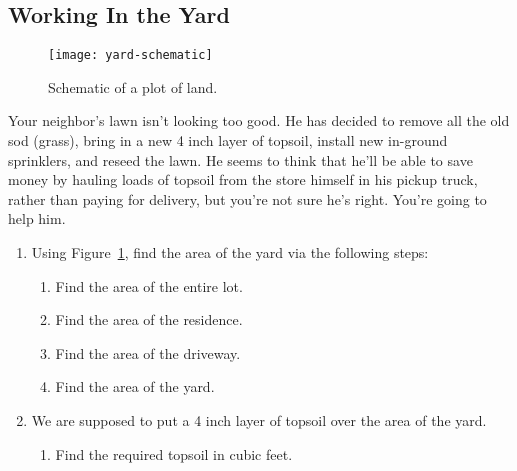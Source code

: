\newpage

\subsection{Working In the Yard}%
\label{sub:working-in-yard}

\begin{figure}[h]
  \centering
  \texttt{[image: yard-schematic]}
  \caption{Schematic of a plot of land.}%
  \label{fig:yard-schematic}
\end{figure}

\begin{exercise}
  Your neighbor's lawn isn't looking too good. He has decided to
  remove all the old sod (grass), bring in a new 4 inch layer of
  topsoil, install new in-ground sprinklers, and reseed the lawn. He
  seems to think that he'll be able to save money by hauling loads of
  topsoil from the store himself in his pickup truck, rather than
  paying for delivery, but you're not sure he's right. You're going to
  help him.
  \begin{enumerate}
  \item Using Figure~\ref{fig:yard-schematic}, find the area of the
    yard via the following steps:
    \begin{enumerate}
    \item Find the area of the entire lot.


    \item Find the area of the residence.


    \item Find the area of the driveway.


    \item Find the area of the yard.
    \end{enumerate}

    \newpage

  \item We are supposed to put a 4 inch layer of topsoil over the area
    of the yard.

    \begin{enumerate}
    \item Find the required topsoil in cubic feet.


\end{enumerate}
\end{enumerate}
\end{exercise}
